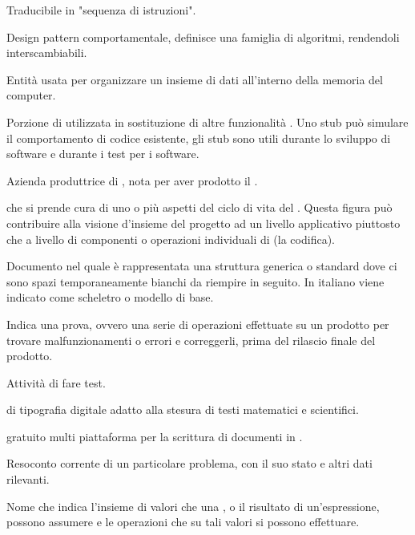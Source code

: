 {Traducibile in "sequenza di istruzioni".}

{Design pattern comportamentale, definisce una famiglia di algoritmi, rendendoli interscambiabili.}

{Entità usata per organizzare un insieme di dati all'interno della memoria del computer.}

{Porzione di  utilizzata in sostituzione di altre funzionalità . Uno stub può simulare il comportamento di codice esistente, gli stub sono utili durante lo sviluppo di software e durante i test per i software.}

{Azienda produttrice di , nota per aver prodotto il  .}

{ che si prende cura di uno o più aspetti del ciclo di vita del . Questa figura può contribuire alla visione d'insieme del progetto ad un livello applicativo piuttosto che a livello di componenti o operazioni individuali di  (la codifica).}




{Documento nel quale è rappresentata una struttura generica o standard dove ci sono spazi temporaneamente bianchi da riempire in seguito. In italiano viene indicato come scheletro o modello di base.}

{Indica una prova, ovvero una serie di operazioni effettuate su un prodotto per trovare malfunzionamenti o errori e correggerli, prima del rilascio finale del prodotto.}

{Attività di fare test.}

{ di tipografia digitale adatto alla stesura di testi matematici e scientifici.}

{ gratuito multi piattaforma per la scrittura di documenti in .}

{Resoconto corrente di un particolare problema, con il suo stato e altri dati rilevanti.}

{Nome che indica l'insieme di valori che una , o il risultato di un'espressione, possono assumere e le operazioni che su tali valori si possono effettuare.}

